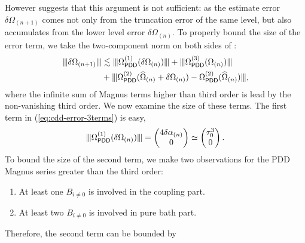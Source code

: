 \documentclass[twocolumn,pra,superscriptaddress]{revtex4-2}
\newcommand{\Opdd}{\Omega_{\mathsf{PDD}}}
\begin{document}
{However  suggests that this argument is not sufficient: as
the estimate error $\delta\Omega_{(n+1)}$ comes not only  from the truncation error of the same level, but also accumulates from the lower level error $\delta\Omega_{(n)}$. 
To properly bound the size of the error term, we take the two-component norm on both sides of :
\begin{equation}
\begin{aligned}\label{eq:cdd-error-3terms}
\opnorm{\delta\Omega_{(n+1)} }
&\lesssim \opnorm{ \Opdd\up{1}(\delta\Omega_{(n)}) } + 
\opnorm{\Opdd\up{3}( \Omega_{(n)})} \\
&+ \opnorm{ \Opdd\up{2}(\Ohat_{(n)}+\delta\Omega_{(n)})-\Opdd\up{2}(\Ohat_{(n)})},
\end{aligned}    
\end{equation}
where the infinite sum of Magnus terms higher than third order is lead by the non-vanishing third order. 
We now examine the size of these terms.
The first term in (\ref{eq:cdd-error-3terms}) is easy,
\begin{equation*}
\opnorm{\Opdd\up{1}(\delta\Omega_{(n)})} = \begin{pmatrix}
4 \delta\alpha_{(n)} \\
0
\end{pmatrix}\simeq
\begin{pmatrix}
\Dt^3 \\
0
\end{pmatrix}.
\end{equation*}
To bound the size of the second term, we make two observations for the PDD Magnus series greater than the third order:
\begin{enumerate}
    \item At least one $B_{i\neq0}$ is involved in the coupling part.
    \item At least two $B_{i\neq 0}$ is involved in pure bath part.  
\end{enumerate}
Therefore, the second term can be bounded by
\begin{equation*}

\end{equation*}}
\end{document}
